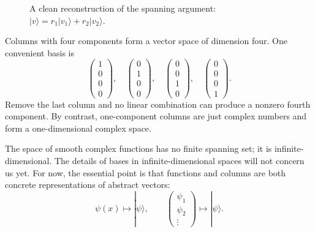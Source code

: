 \begin{figure}[tbp]
\centering
{}
\caption{A clean reconstruction of the spanning argument:
\(|v\rangle=r_1|v_1\rangle+r_2|v_2\rangle\).}
\end{figure}

Columns with four components form a vector space of dimension four. One
convenient basis is
\begin{equation}
 \begin{pmatrix}1\\0\\0\\0\end{pmatrix},
 \quad
 \begin{pmatrix}0\\1\\0\\0\end{pmatrix},
 \quad
 \begin{pmatrix}0\\0\\1\\0\end{pmatrix},
 \quad
 \begin{pmatrix}0\\0\\0\\1\end{pmatrix}.
 \label{eq:l02-standard-columns}
\end{equation}
Remove the last column and no linear combination can produce a nonzero
fourth component. By contrast, one-component columns are just complex
numbers and form a one-dimensional complex space.

The space of smooth complex functions has no finite spanning set; it is
infinite-dimensional. The details of bases in infinite-dimensional spaces
will not concern us yet. For now, the essential point is that functions and
columns are both concrete representations of abstract vectors:
\begin{equation}
 \psi(x)\longmapsto|\psi\rangle,
 \qquad
 \begin{pmatrix}\psi_1\\ \psi_2\\ \vdots\end{pmatrix}
 \longmapsto|\psi\rangle.
 \label{eq:l02-function-ket}
\end{equation}

